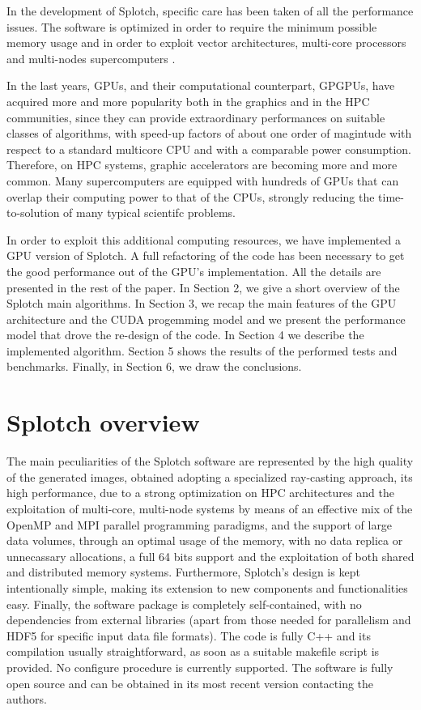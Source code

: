 \documentclass[11pt]{article}
\begin{document}
In the development of Splotch, specific care has been taken of all the performance 
issues. The software is optimized in order to require the minimum possible
memory usage and in order to exploit vector architectures, multi-core processors 
and multi-nodes supercomputers \cite{jin:high-performance}. 

In the last years, 
GPUs, and their computational counterpart, GPGPUs, have 
acquired more and more popularity both in the graphics and in the HPC 
communities, since they can provide extraordinary performances on suitable
classes of algorithms, with speed-up factors of about one order of magintude with respect to 
a standard multicore CPU and with a comparable power consumption.
Therefore, on HPC systems, graphic accelerators are becoming more and more common. 
Many supercomputers are equipped with hundreds of GPUs that can overlap 
their computing power to that of the CPUs, strongly reducing the time-to-solution
of many typical scientifc problems.

In order to exploit this additional computing resources, we have implemented 
a GPU version of Splotch. A full refactoring of the code has been necessary 
to get the good performance out of the GPU's implementation. 
All the details are presented in the rest of the paper. In Section 2, we give a short 
overview of the Splotch main algorithms. In Section 3, we recap the main features
of the GPU architecture and the CUDA progemming model
and we present the performance model that drove the 
re-design of the code. In Section 4 
we describe the implemented algorithm. Section 5 shows
the results of the performed tests and benchmarks. Finally, in Section 6, we draw 
the conclusions. 

\section{Splotch overview}
\label{sec:overview}

The main peculiarities of the Splotch software are represented by the 
high quality of the generated images, obtained adopting a specialized ray-casting 
approach, its high performance, due to a strong optimization on HPC architectures and the exploitation of multi-core, multi-node 
systems by means of an effective mix of the OpenMP and MPI parallel programming paradigms, and
the support of large data volumes, through an optimal usage of the memory, with
no data replica or unnecassary allocations, a full 64 bits support and the exploitation
of both shared and distributed memory systems. Furthermore, Splotch's design is kept 
intentionally simple, making its extension to new components and functionalities easy. 
Finally, the software package is completely self-contained, with no dependencies from external 
libraries (apart from those needed for parallelism and HDF5 \cite{hdf5}  for
specific input data file formats). The code is fully C++ and its compilation
usually straightforward, as soon as a suitable makefile script is provided.
No configure procedure is currently supported. The software is fully open source and 
can be obtained in its most recent version contacting the authors.
\end{document}
